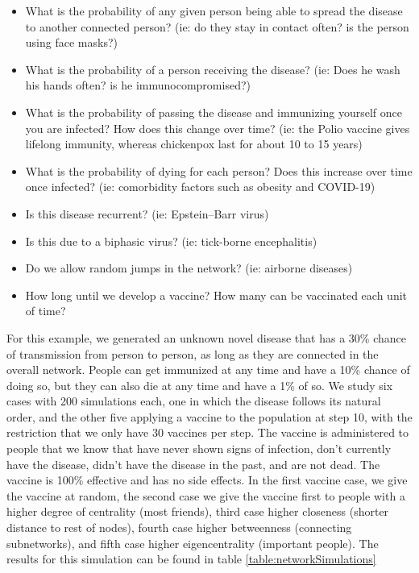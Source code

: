 \begin{itemize}

    \item What is the probability of any given person being able to spread the disease to another connected person? (ie: do they stay in contact often? is the person using face masks?)
    
    \item What is the probability of a person receiving the disease? (ie: Does he wash his hands often? is he immunocompromised?)
    
    \item What is the probability of passing the disease and immunizing yourself once you are infected? How does this change over time? (ie: the Polio vaccine gives lifelong immunity, whereas chickenpox last for about 10 to 15 years)
    
    \item What is the probability of dying for each person? Does this increase over time once infected? (ie: comorbidity factors such as obesity and COVID-19)
    
    \item Is this disease recurrent? (ie: Epstein–Barr virus)
    
    \item Is this due to a biphasic virus? (ie: tick-borne encephalitis)
    
    \item Do we allow random jumps in the network? (ie: airborne diseases)
    
    \item How long until we develop a vaccine? How many can be vaccinated each unit of time?
    
\end{itemize}

For this example, we generated an unknown novel disease that has a 30\% chance of transmission from person to person, as long as they are connected in the overall network. People can get immunized at any time and have a 10\% chance of doing so, but they can also die at any time and have a 1\% of so. We study six cases with 200 simulations each, one in which the disease follows its natural order, and the other five applying a vaccine to the population at step 10, with the restriction that we only have 30 vaccines per step.  The vaccine is administered to people that we know that have never shown signs of infection, don't currently have the disease, didn't have the disease in the past, and are not dead. The vaccine is 100\% effective and has no side effects. In the first vaccine case, we give the vaccine at random, the second case we give the vaccine first to people with a higher degree of centrality (most friends), third case higher closeness (shorter distance to rest of nodes), fourth case higher betweenness (connecting subnetworks), and fifth case higher eigencentrality (important people). The results for this simulation can be found in table \ref{table:networkSimulations} 

